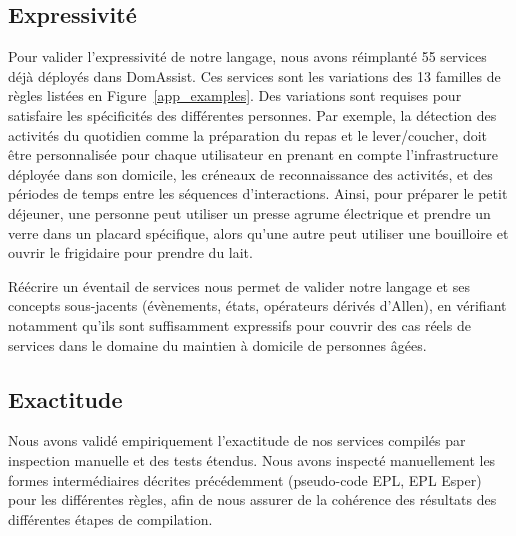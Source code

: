 \subsection{Expressivité}\label{validation:expressiveness}
Pour valider l'expressivité de notre langage, nous avons réimplanté 55
services déjà déployés dans DomAssist. Ces services sont les
variations des 13 familles de règles listées en
Figure~\ref{app_examples}. Des variations sont requises pour
satisfaire les spécificités des différentes personnes. Par exemple, la
détection des activités du quotidien comme la préparation du repas et
le lever/coucher, doit être personnalisée pour chaque utilisateur en
prenant en compte l'infrastructure déployée dans son domicile, les
créneaux de reconnaissance des activités, et des périodes de temps
entre les séquences d'interactions.  Ainsi, pour préparer le
petit déjeuner, une personne peut utiliser un presse agrume électrique
et prendre un verre dans un placard spécifique, alors qu'une autre
peut utiliser une bouilloire et ouvrir le frigidaire pour prendre du
lait.  

Réécrire un éventail de services nous permet de valider notre langage et 
ses concepts sous-jacents (évènements, états, opérateurs dérivés d'Allen), en
vérifiant notamment qu'ils sont suffisamment expressifs pour couvrir des cas réels de 
services dans le domaine du maintien à domicile de personnes âgées.

\subsection{Exactitude}\label{validation:results}

Nous avons validé empiriquement l'exactitude de nos services compilés
par inspection manuelle et des tests étendus. Nous avons inspecté
manuellement les formes intermédiaires décrites précédemment
(pseudo-code EPL, EPL Esper) pour les différentes règles, afin de nous
assurer de la cohérence des résultats des différentes étapes de
compilation.

